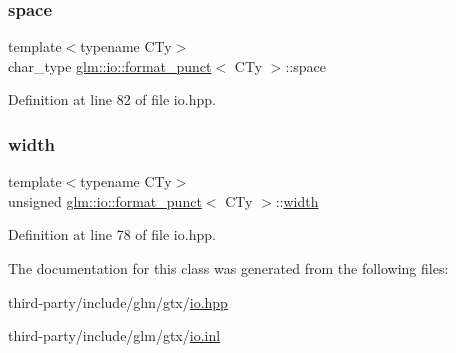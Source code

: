 \mbox{\label{classglm_1_1io_1_1format__punct_adf9a915938727793de1daca07dcdfa4e}} 
\subsubsection{\texorpdfstring{space}{space}}
{\footnotesize\ttfamily template$<$typename C\+Ty$>$ \\
char\+\_\+type \hyperlink{classglm_1_1io_1_1format__punct}{glm\+::io\+::format\+\_\+punct}$<$ C\+Ty $>$\+::space}



Definition at line 82 of file io.\+hpp.

\mbox{\label{classglm_1_1io_1_1format__punct_a95d32ca2330bbf7c50d3e066b7a851db}} 
\subsubsection{\texorpdfstring{width}{width}}
{\footnotesize\ttfamily template$<$typename C\+Ty$>$ \\
unsigned \hyperlink{classglm_1_1io_1_1format__punct}{glm\+::io\+::format\+\_\+punct}$<$ C\+Ty $>$\+::\hyperlink{structglm_1_1io_1_1width}{width}}



Definition at line 78 of file io.\+hpp.



The documentation for this class was generated from the following files\+:\begin{DoxyCompactItemize}
\item 
third-\/party/include/glm/gtx/\hyperlink{io_8hpp}{io.\+hpp}\item 
third-\/party/include/glm/gtx/\hyperlink{io_8inl}{io.\+inl}\end{DoxyCompactItemize}
